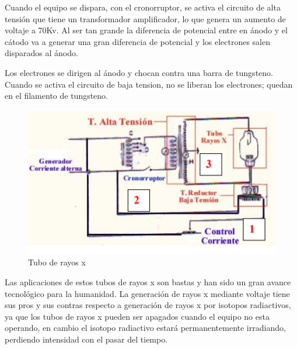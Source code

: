 Cuando el equipo se dispara, con el cronorruptor, se activa el circuito de alta tensión que tiene un transformador amplificador, lo que genera un aumento de voltaje a 70Kv. Al ser tan grande la diferencia de potencial entre en ánodo y el cátodo va a generar una gran diferencia de potencial y los electrones salen disparados al ánodo. 

Los electrones se dirigen al ánodo y chocan contra una barra de tungsteno. Cuando se activa el circuito de baja tension, no se liberan los electrones; quedan en el filamento de tungsteno.\\

\begin{figure}[H]
\centering
\includegraphics[width=12cm]{capitulo3/figs/rayos.png}
\caption{ Tubo de rayos x}
\end{figure}

Las aplicaciones de estos tubos de rayos x son bastas y han sido un gran avance tecnológico para la humanidad. La generación de rayos x mediante voltaje tiene sus pros y sus contras respecto a generación de rayos x por isotopos radiactivos, ya que los tubos de rayos x pueden ser apagados cuando el equipo no esta operando, en cambio el isotopo radiactivo estará permanentemente irradiando, perdiendo intensidad con el pasar del tiempo.  \\


